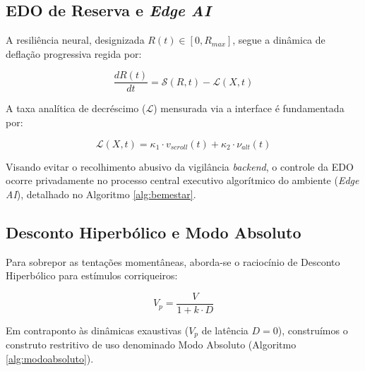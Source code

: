 \subsection{EDO de Reserva e \textit{Edge AI}}
A resiliência neural, designizada $R(t) \in [0, R_{max}]$, segue a dinâmica de deflação progressiva regida por:

\begin{equation} \label{eq:reserva}
    \frac{dR(t)}{dt} = \mathcal{S}(R,t) - \mathcal{L}(X,t)
\end{equation}

A taxa analítica de decréscimo ($\mathcal{L}$) mensurada via a interface é fundamentada por:

\begin{equation} \label{eq:esgotamento}
    \mathcal{L}(X,t) = \kappa_1 \cdot v_{scroll}(t) + \kappa_2 \cdot \nu_{alt}(t)
\end{equation}

Visando evitar o recolhimento abusivo da vigilância \textit{backend}, o controle da EDO ocorre privadamente no processo central executivo algorítmico do ambiente (\textit{Edge AI}), detalhado no Algoritmo \ref{alg:bemestar}.

\begin{algorithm}[h]
\caption{Sub-rotina de Regulação de Fadiga (Execução On-Device)}
\label{alg:bemestar}
\end{algorithm}

\subsection{Desconto Hiperbólico e Modo Absoluto}
Para sobrepor as tentações momentâneas, aborda-se o raciocínio de Desconto Hiperbólico para estímulos corriqueiros:

\begin{equation} \label{eq:hiperbolico}
    V_p = \frac{V}{1 + k \cdot D}
\end{equation}

Em contraponto às dinâmicas exaustivas ($V_p$ de latência $D=0$), construímos o construto restritivo de uso denominado Modo Absoluto (Algoritmo \ref{alg:modoabsoluto}).

